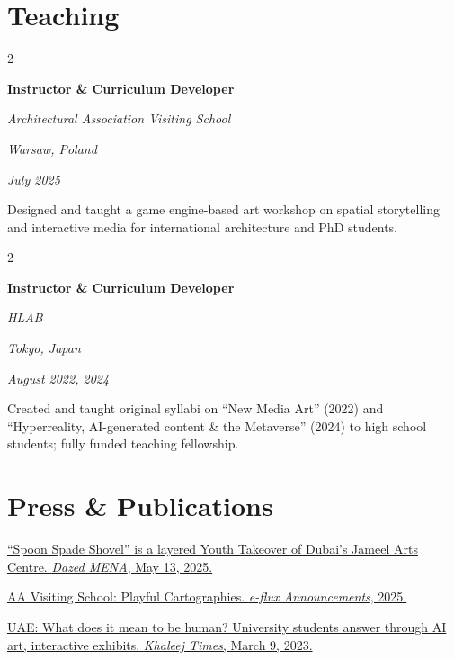 \documentclass[11pt,a4paper]{article}
\newenvironment{onecolentry}{
    \vspace{0.1em}
}{
    \vspace{0.1em}
}
\newenvironment{twocolentry}[2][]{
    \onecolentry
    \def\secondColumn{#2}
    \setcolumnwidth{\fill, 5.0 cm}
    \begin{paracol}{2}
}{
    \switchcolumn \raggedleft \secondColumn
    \end{paracol}
    \endonecolentry
}
\begin{document}
\section*{Teaching}

\begin{twocolentry}{
    \textit{Warsaw, Poland}

    \textit{July 2025}
}
    \textbf{Instructor \& Curriculum Developer}

    \textit{Architectural Association Visiting School}
\end{twocolentry}
\vspace{0.10 cm}
\begin{onecolentry}
    Designed and taught a game engine-based art workshop on spatial storytelling and interactive media for international architecture and PhD students.
\end{onecolentry}

\begin{twocolentry}{
    \textit{Tokyo, Japan}

    \textit{August 2022, 2024}
}
    \textbf{Instructor \& Curriculum Developer}

    \textit{HLAB}
\end{twocolentry}
\vspace{0.10 cm}
\begin{onecolentry}
    Created and taught original syllabi on ``New Media Art'' (2022) and ``Hyperreality, AI-generated content \& the Metaverse'' (2024) to high school students; fully funded teaching fellowship.
\end{onecolentry}

\section*{Press \& Publications}

\href{https://www.dazed.me/news/spoon-spade-shovel-is-a-layered-youth-takeover-of-dubais-jameel-arts-centre}{``Spoon Spade Shovel'' is a layered Youth Takeover of Dubai's Jameel Arts Centre. \textit{Dazed MENA}, May 13, 2025.}

\href{https://www.e-flux.com/announcements/6783946/aa-visiting-school-playful-cartographies}{AA Visiting School: Playful Cartographies. \textit{e-flux Announcements}, 2025.}

\href{https://www.khaleejtimes.com/lifestyle/arts-and-culture/uae-what-does-it-mean-to-be-human-university-students-answer-through-ai-art-interactive-exhibits}{UAE: What does it mean to be human? University students answer through AI art, interactive exhibits. \textit{Khaleej Times}, March 9, 2023.}
\end{document}

